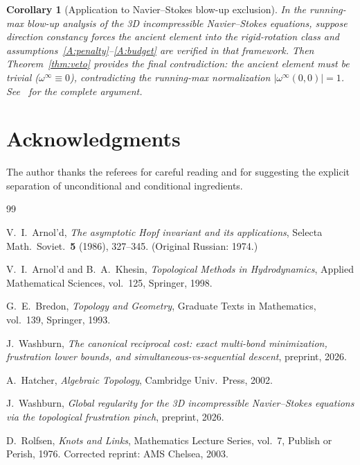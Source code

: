 \documentclass[11pt]{amsart}
\newtheorem{corollary}[theorem]{Corollary}
\theoremstyle{definition}
\theoremstyle{remark}
\begin{document}
\begin{corollary}[Application to Navier--Stokes blow-up exclusion]
\label{cor:ns}
In the running-max blow-up analysis of the 3D incompressible
Navier--Stokes equations, suppose direction constancy forces the ancient
element into the rigid-rotation class and
assumptions~\ref{A:penalty}--\ref{A:budget} are verified in that
framework.
Then Theorem~\ref{thm:veto} provides the final contradiction:
the ancient element must be trivial ($\omega^\infty\equiv 0$),
contradicting the running-max normalization $|\omega^\infty(0,0)|=1$.
See~\cite{NS} for the complete argument.
\end{corollary}

\section*{Acknowledgments}
The author thanks the referees for careful reading and for suggesting
the explicit separation of unconditional and conditional ingredients.

\begin{thebibliography}{99}

V.~I.~Arnol'd,
\emph{The asymptotic Hopf invariant and its applications},
Selecta Math.\ Soviet.\ \textbf{5} (1986), 327--345.
(Original Russian: 1974.)

V.~I.~Arnol'd and B.~A.~Khesin,
\emph{Topological Methods in Hydrodynamics},
Applied Mathematical Sciences, vol.~125, Springer, 1998.

G.~E.~Bredon,
\emph{Topology and Geometry},
Graduate Texts in Mathematics, vol.~139, Springer, 1993.

J.~Washburn,
\emph{The canonical reciprocal cost: exact multi-bond minimization,
frustration lower bounds, and simultaneous-vs-sequential descent},
preprint, 2026.

A.~Hatcher,
\emph{Algebraic Topology},
Cambridge Univ.\ Press, 2002.

J.~Washburn,
\emph{Global regularity for the 3D incompressible Navier--Stokes
equations via the topological frustration pinch},
preprint, 2026.

D.~Rolfsen,
\emph{Knots and Links},
Mathematics Lecture Series, vol.~7, Publish or Perish, 1976.
Corrected reprint: AMS Chelsea, 2003.

\end{thebibliography}
\end{document}
